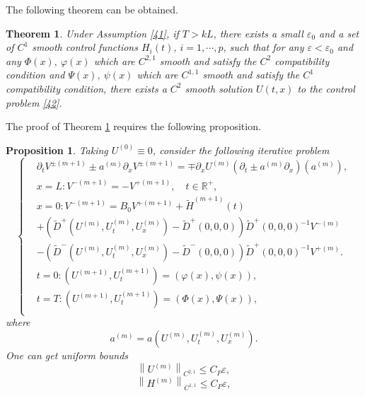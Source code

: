 \documentclass[a4paper,reqno,11pt]{amsart}
\numberwithin{equation}{section} %
\newtheorem{prop}[lem]{Proposition}
\newtheorem{thm}{Theorem}
\begin{document}
The following theorem can be obtained.
\begin{thm} \label{thm:main}
	Under Assumption \eqref{41}, if $T > kL$, there exists a small $\varepsilon _0$ and a set of $C^1$ smooth control functions $H_i(t)$, $i=1,\cdots ,p$, such that for any $\varepsilon < \varepsilon _0 $ and any $\varPhi (x),\ \varphi  (x)$ which are $C^{2,1}$ smooth and satisfy the $C^2$ compatibility condition and $\varPsi (x),\ \psi (x)$ which are $C^{1,1}$ smooth and satisfy the $C^1$ compatibility condition, there exists a $C^2$ smooth solution $U(t,x)$ to the control problem \eqref{42}.
\end{thm}

The proof of Theorem \ref{thm:main} requires the following proposition.
\begin{prop}\label{prop:main}
	Taking $U^{(0)}\equiv 0$, consider the following iterative problem
	\begin{equation}
\begin{cases}
	&		\partial _tV^{\pm (m+1)}\pm a^{(m)}\partial _xV^{\pm (m+1)}=\mp \partial _xU^{(m)}\left( \partial _t\pm a^{(m)}\partial _x \right) \left( a^{(m)} \right) ,\\
	&		x=L:V^{-(m+1)}=-V^{+(m+1)},\quad t\in \mathbb{R} ^+,\\
	&		x=0:V^{-(m+1)}=B_0V^{+(m+1)}+\widetilde{H}^{(m+1)}(t)\\
	&		+\left( \widetilde{D}^+\left( U^{(m)},U_{t}^{(m)},U_{x}^{(m)} \right) -\widetilde{D}^+(0,0,0) \right) \widetilde{D}^+(0,0,0)^{-1}V^{-(m)}\\
	&		-\left( \widetilde{D}^-\left( U^{(m)},U_{t}^{(m)},U_{x}^{(m)} \right) -\widetilde{D}^-(0,0,0) \right) \widetilde{D}^+(0,0,0)^{-1}V^{+(m)}.\\
	&		t=0:\left( U^{(m+1)},U_{t}^{(m+1)} \right) =\left( \varphi \left( x \right) ,\psi \left( x \right) \right) ,\\
	&		t=T:\left( U^{(m+1)},U_{t}^{(m+1)} \right) =\left( \varPhi \left( x \right) ,\varPsi \left( x \right) \right) ,\\
\end{cases}
	\end{equation}
where
$$
a^{(m)}=a\left(U^{(m)}, U_t^{(m)}, U_x^{(m)}\right) .
$$
One can get uniform bounds
\begin{equation}\label{bounds u}
 \left\lVert U^{\left( m \right)}\right\rVert  _{C^{2,1}}\leq C_P\varepsilon ,
\end{equation}
\begin{equation}\label{bounds h}
 \left\lVert H^{\left( m \right)}\right\rVert  _{C^{1,1}}\leq C_P\varepsilon ,

\end{equation}
\end{prop}
\end{document}
